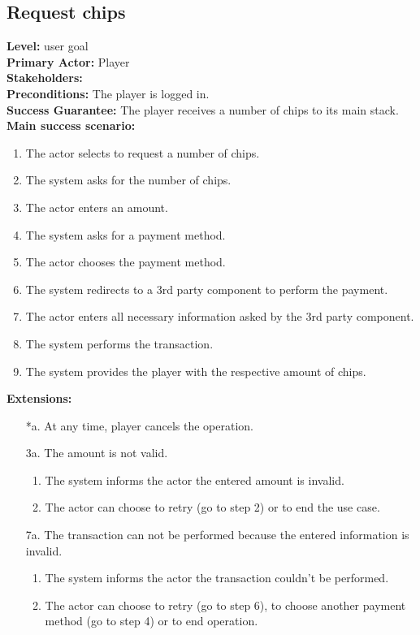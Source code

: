 \documentclass[a4paper,11pt]{report}
\begin{document}
\subsection{Request chips}
\textbf{Level:} user goal \\
\textbf{Primary Actor:} Player \\
\textbf{Stakeholders:} \\
\textbf{Preconditions:} The player is logged in. \\
\textbf{Success Guarantee:} The player receives a number of chips to its main stack. \\
\textbf{Main success scenario:} 
\begin{enumerate}
\item The actor selects to request a number of chips. 
\item The system asks for the number of chips. 
\item The actor enters an amount. 
\item The system asks for a payment method. 
\item The actor chooses the payment method. 
\item The system redirects to a 3rd party component to perform the payment.
\item The actor enters all necessary information asked by the 3rd party component. 
\item The system performs the transaction. 
\item The system provides the player with the respective amount of chips. 
\end{enumerate}
\textbf{Extensions:}
\begin{itemize}
\item[*a.] At any time, player cancels the operation. 
\item[3a.] The amount is not valid. 
\begin{enumerate}
\item The system informs the actor the entered amount is invalid. 
\item The actor can choose to retry (go to step 2) or to end the use case. 
\end{enumerate}
\item[7a.] The transaction can not be performed because the entered information is invalid. 
\begin{enumerate}
\item The system informs the actor the transaction couldn't be performed. 
\item The actor can choose to retry (go to step 6), to choose another payment method (go to step 4) or to end operation. 
\end{enumerate}
\end{itemize}
\end{document}
